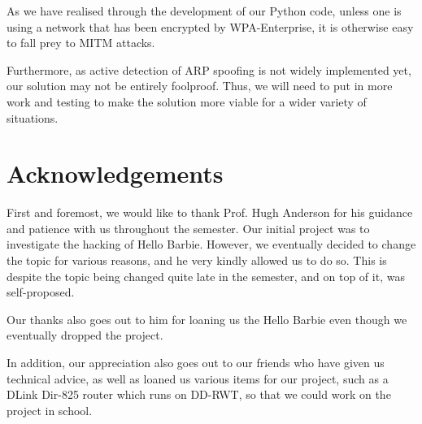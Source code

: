 \documentclass{acm_proc_article-sp}
\begin{document}
As we have realised through the development of our Python code, unless one is using a network that has been encrypted by WPA-Enterprise, it is otherwise easy to fall prey to MITM attacks. 

Furthermore, as active detection of ARP spoofing is not widely implemented yet, our solution may not be entirely foolproof. Thus, we will need to put in more work and testing to make the solution more viable for a wider variety of situations. 


\section{Acknowledgements}
First and foremost, we would like to thank Prof. Hugh Anderson for his guidance and patience with us throughout the semester. Our initial project was to investigate the hacking of Hello Barbie. However, we eventually decided to change the topic for various reasons, and he very kindly allowed us to do so. This is despite the topic being changed quite late in the semester, and on top of it, was self-proposed. 

Our thanks also goes out to him for loaning us the Hello Barbie even though we eventually dropped the project. 

In addition, our appreciation also goes out to our friends who have given us technical advice, as well as loaned us various items for our project, such as a DLink Dir-825 router which runs on DD-RWT, so that we could work on the project in school. 

%

%
% 
\end{document}
